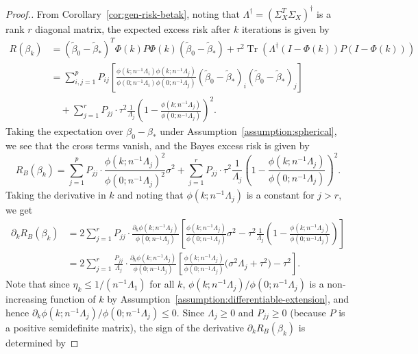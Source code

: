 \documentclass[11pt]{article}
\DeclareMathOperator{\Tr}{Tr}
\begin{document}
\begin{proof}[Proof.]
From Corollary~\ref{cor:gen-risk-betak}, noting that $\Lambda^\dagger = (\Sigma_X^T \Sigma_X)^{\dagger}$ is a rank $r$ diagonal matrix, the expected excess risk after $k$ iterations is given by
\begin{align*} 
    R(\beta_k) &= (\tilde{\beta}_0 - \tilde{\beta}_*)^T \Phi(k) P \Phi(k) (\tilde{\beta}_0 - \tilde{\beta}_*) + \tau^2\Tr\left( \Lambda^\dagger (I-\Phi(k))P(I-\Phi(k)) \right)\\
    &= \sum_{i,j=1}^p P_{ij} \left[\frac{\phi(k; n^{-1}\Lambda_i)\phi(k; n^{-1}\Lambda_j)}{\phi(0; n^{-1}\Lambda_i)\phi(0; n^{-1}\Lambda_j)}(\tilde{\beta}_0 - \tilde{\beta}_*)_i(\tilde{\beta}_0 - \tilde{\beta}_*)_j \right] \\
    &\quad+ \sum_{j=1}^r P_{jj} \cdot \tau^2\frac{1}{\Lambda_j}\left(1-\frac{\phi(k; n^{-1}\Lambda_j)}{\phi(0; n^{-1}\Lambda_j)}\right)^2.
\end{align*}
Taking the expectation over $\beta_0 - \beta_*$ under Assumption~\ref{assumption:spherical}, we see that the cross terms vanish, and the Bayes excess risk is given by
\begin{equation} \label{eq:earlystopping_1}
    R_B(\beta_k) = \sum_{j=1}^{p} P_{jj} \cdot \frac{\phi(k;n^{-1}\Lambda_j)^2}{\phi(0;n^{-1}\Lambda_j)^2}\sigma^2 
    + \sum_{j=1}^r P_{jj} \cdot \tau^2\frac{1}{\Lambda_j}\left(1-\frac{\phi(k; n^{-1}\Lambda_j)}{\phi(0; n^{-1}\Lambda_j)}\right)^2.
\end{equation}
Taking the derivative in $k$ and noting that $\phi(k; n^{-1}\Lambda_j)$ is a constant for $j > r$, we get
\begin{align}
    \partial_k R_B(\beta_k)
    &= 2\sum_{j=1}^r P_{jj} \cdot \frac{\partial_k \phi(k; n^{-1}\Lambda_j)}{\phi(0; n^{-1}\Lambda_j)} \left[\frac{\phi(k; n^{-1}\Lambda_j)}{\phi(0; n^{-1}\Lambda_j)}\sigma^2 - \tau^2 \frac{1}{\Lambda_j}\left(1-\frac{\phi(k; n^{-1}\Lambda_j)}{\phi(0;n^{-1}\Lambda_j)}\right) \right] \nonumber\\
    &= 2\sum_{j=1}^r \frac{P_{jj}}{\Lambda_j} \cdot \frac{\partial_k \phi(k; n^{-1}\Lambda_j)}{\phi(0; n^{-1}\Lambda_j)} \left[\frac{\phi(k;n^{-1}\Lambda_j)}{\phi(0; n^{-1}\Lambda_j)} \Big(\sigma^2 \Lambda_j + \tau^2\Big) - \tau^2  \right]. \label{eq:risk-derivative-mu0}
\end{align}
Note that since $\eta_k \le 1/(n^{-1} \Lambda_1)$ for all $k$, $\phi(k; n^{-1}\Lambda_j) / \phi(0; n^{-1} \Lambda_j)$ is a non-increasing function of $k$ by Assumption~\ref{assumption:differentiable-extension}, and hence $\partial_k \phi(k; n^{-1}\Lambda_j) / \phi(0; n^{-1} \Lambda_j) \leq 0$. Since $\Lambda_j \ge 0$ and $P_{jj} \geq 0$ (because $P$ is a positive semidefinite matrix), the sign of the derivative $\partial_k R_B(\beta_k)$ is determined by 

\end{proof}
\end{document}
